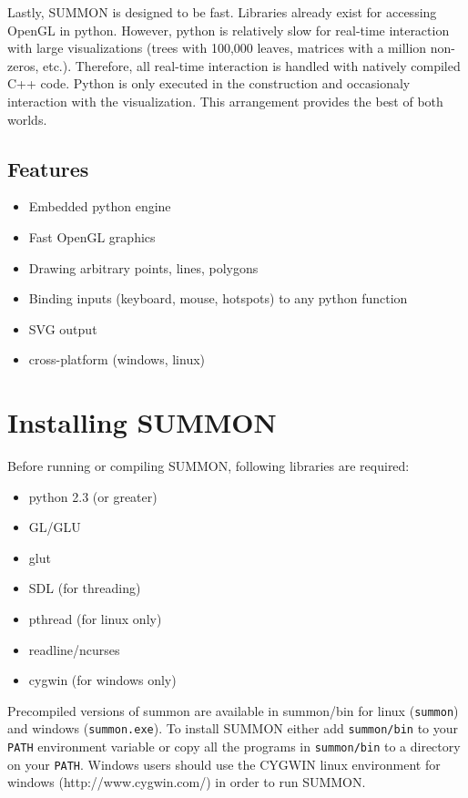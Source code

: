 \documentclass[12pt]{article}
\newcommand{\items}[1]{\begin{itemize} #1 \end{itemize}}
\newcommand{\code}[1]{{\tt #1}}
\begin{document}
Lastly, SUMMON is designed to be fast.  Libraries already exist for
accessing OpenGL in python.  However, python is relatively slow for real-time
interaction with large visualizations (trees with 100,000 leaves, matrices with
a million non-zeros, etc.).  Therefore, all real-time interaction is handled
with natively compiled C++ code.  Python is only executed in the construction 
and occasionaly interaction with the visualization.  This arrangement provides 
the best of both worlds.




\subsection{Features}

\items{
    \item Embedded python engine
    \item Fast OpenGL graphics    
    \item Drawing arbitrary points, lines, polygons
    \item Binding inputs (keyboard, mouse, hotspots) to any python function 
    \item SVG output
    \item cross-platform (windows, linux)
}

\section{Installing SUMMON}
\label{sec:installing}

Before running or compiling SUMMON, following libraries are required:
\items {
    \item python 2.3 (or greater)
    \item GL/GLU    
    \item glut 
    \item SDL (for threading)
    \item pthread (for linux only)
    \item readline/ncurses
    \item cygwin (for windows only)
}

Precompiled versions of summon are available in summon/bin for linux
(\code{summon}) and windows (\code{summon.exe}).  To install SUMMON either add
\code{summon/bin} to your \code{PATH} environment variable or copy all the
programs in \code{summon/bin} to a directory on your \code{PATH}.  Windows users
should use the CYGWIN linux environment for windows (http://www.cygwin.com/) in
order to run SUMMON.
\end{document}
